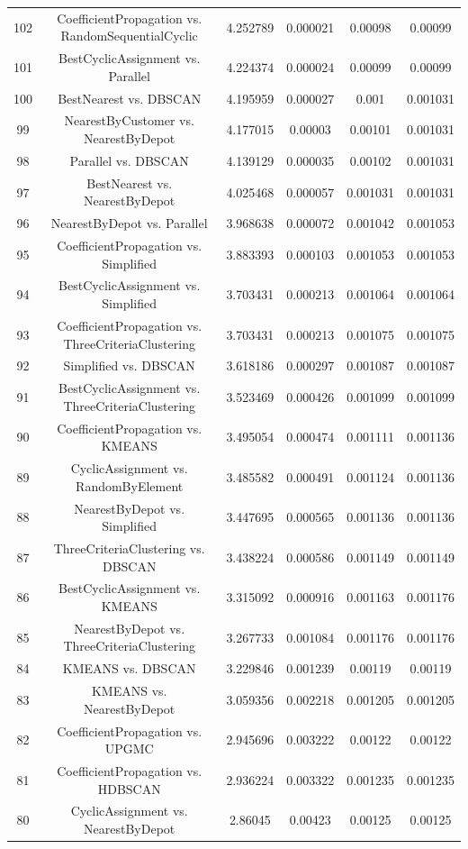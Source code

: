 \documentclass[a4paper,10pt]{article}
\begin{document}
\begin{landscape}
\begin{table}[!htp]
\begin{tabular}{cccccc}
102&CoefficientPropagation vs. RandomSequentialCyclic&4.252789&0.000021&0.00098&0.00099\\
101&BestCyclicAssignment vs. Parallel&4.224374&0.000024&0.00099&0.00099\\
100&BestNearest vs. DBSCAN&4.195959&0.000027&0.001&0.001031\\
99&NearestByCustomer vs. NearestByDepot&4.177015&0.00003&0.00101&0.001031\\
98&Parallel vs. DBSCAN&4.139129&0.000035&0.00102&0.001031\\
97&BestNearest vs. NearestByDepot&4.025468&0.000057&0.001031&0.001031\\
96&NearestByDepot vs. Parallel&3.968638&0.000072&0.001042&0.001053\\
95&CoefficientPropagation vs. Simplified&3.883393&0.000103&0.001053&0.001053\\
94&BestCyclicAssignment vs. Simplified&3.703431&0.000213&0.001064&0.001064\\
93&CoefficientPropagation vs. ThreeCriteriaClustering&3.703431&0.000213&0.001075&0.001075\\
92&Simplified vs. DBSCAN&3.618186&0.000297&0.001087&0.001087\\
91&BestCyclicAssignment vs. ThreeCriteriaClustering&3.523469&0.000426&0.001099&0.001099\\
90&CoefficientPropagation vs. KMEANS&3.495054&0.000474&0.001111&0.001136\\
89&CyclicAssignment vs. RandomByElement&3.485582&0.000491&0.001124&0.001136\\
88&NearestByDepot vs. Simplified&3.447695&0.000565&0.001136&0.001136\\
87&ThreeCriteriaClustering vs. DBSCAN&3.438224&0.000586&0.001149&0.001149\\
86&BestCyclicAssignment vs. KMEANS&3.315092&0.000916&0.001163&0.001176\\
85&NearestByDepot vs. ThreeCriteriaClustering&3.267733&0.001084&0.001176&0.001176\\
84&KMEANS vs. DBSCAN&3.229846&0.001239&0.00119&0.00119\\
83&KMEANS vs. NearestByDepot&3.059356&0.002218&0.001205&0.001205\\
82&CoefficientPropagation vs. UPGMC&2.945696&0.003222&0.00122&0.00122\\
81&CoefficientPropagation vs. HDBSCAN&2.936224&0.003322&0.001235&0.001235\\
80&CyclicAssignment vs. NearestByDepot&2.86045&0.00423&0.00125&0.00125\\

\end{tabular}
\end{table}
\end{landscape}
\end{document}
